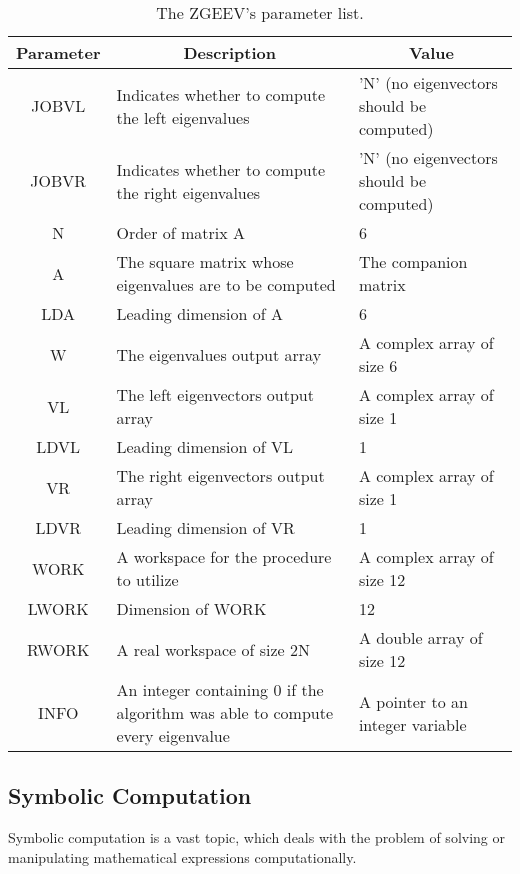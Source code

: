 \begin{table}[H]\label{tab:zgeev}
	\begin{center}
	\begin{tabular}{|c|m{18em}|m{8em}|}
		
		\hline
		\textbf{Parameter} & \multicolumn{1}{c|}{\textbf{Description}} & \multicolumn{1}{c|}{\textbf{Value}}\\
		\hline
		JOBVL&  Indicates whether to compute the left eigenvalues&  'N' (no eigenvectors should be computed)\\
		\hline
		JOBVR&  Indicates whether to compute the right eigenvalues&  'N' (no eigenvectors should be computed)\\
		\hline
		N    &  Order of matrix A &  6\\
		\hline
		A    &  The square matrix whose eigenvalues are to be computed & The companion matrix \\
		\hline
		LDA  &  Leading dimension of A & 6 \\
		\hline
		W    &  The eigenvalues output array &  A complex array of size 6\\
		\hline
		VL   &  The left eigenvectors output array & A complex array of size 1 \\
		\hline
		LDVL &  Leading dimension of VL&  1\\
		\hline
		VR   &  The right eigenvectors output array&  A complex array of size 1\\
		\hline
		LDVR &  Leading dimension of VR&  1\\
		\hline
		WORK &  A workspace for the procedure to utilize&  A complex array of size 12\\
		\hline
		LWORK&  Dimension of WORK &  12\\
		\hline
		RWORK&  A real workspace of size 2N &  A double array of size 12\\
		\hline
		INFO &  An integer containing $0$ if the algorithm was able to compute every eigenvalue &  A pointer to an integer variable\\
		\hline
	\end{tabular}
	\end{center}
	\caption{The ZGEEV's parameter list.}
\end{table}

\subsection{Symbolic Computation}

Symbolic computation is a vast topic, which deals with the problem of solving or manipulating mathematical expressions computationally. 

